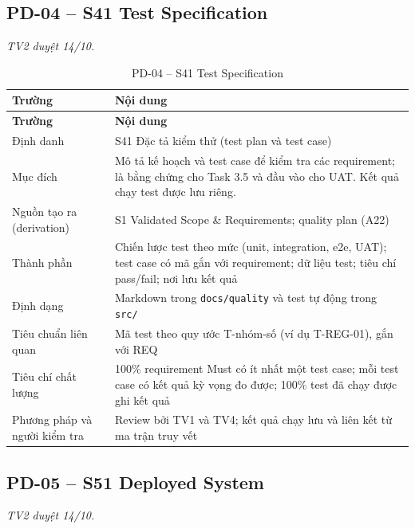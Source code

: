 \subsection*{PD-04 -- S41 Test Specification}
\noindent\textit{TV2 duyệt 14/10.}

\begingroup\tblsetup\tblzebra
\begin{longtable}{L{3.4cm}L{11.6cm}}
\caption{PD-04 -- S41 Test Specification}\label{tab:pd-04}\\
\toprule
{}\textbf{Trường} & \textbf{Nội dung} \\
\midrule
\endfirsthead
\toprule
{}\textbf{Trường} & \textbf{Nội dung} \\
\midrule
\endhead
\bottomrule
\endlastfoot
Định danh & S41 Đặc tả kiểm thử (test plan và test case) \\
Mục đích & Mô tả kế hoạch và test case để kiểm tra các requirement; là bằng chứng cho Task 3.5 và đầu vào cho UAT. Kết quả chạy test được lưu riêng. \\
Nguồn tạo ra (derivation) & S1 Validated Scope \& Requirements; quality plan (A22) \\
Thành phần & Chiến lược test theo mức (unit, integration, e2e, UAT); test case có mã gắn với requirement; dữ liệu test; tiêu chí pass/fail; nơi lưu kết quả \\
Định dạng & Markdown trong \texttt{docs/quality} và test tự động trong \texttt{src/} \\
Tiêu chuẩn liên quan & Mã test theo quy ước T-nhóm-số (ví dụ T-REG-01), gắn với REQ \\
Tiêu chí chất lượng & 100\% requirement Must có ít nhất một test case; mỗi test case có kết quả kỳ vọng đo được; 100\% test đã chạy được ghi kết quả \\
Phương pháp và người kiểm tra & Review bởi TV1 và TV4; kết quả chạy lưu và liên kết từ ma trận truy vết \\
\end{longtable}
\endgroup

\subsection*{PD-05 -- S51 Deployed System}
\noindent\textit{TV2 duyệt 14/10.}

